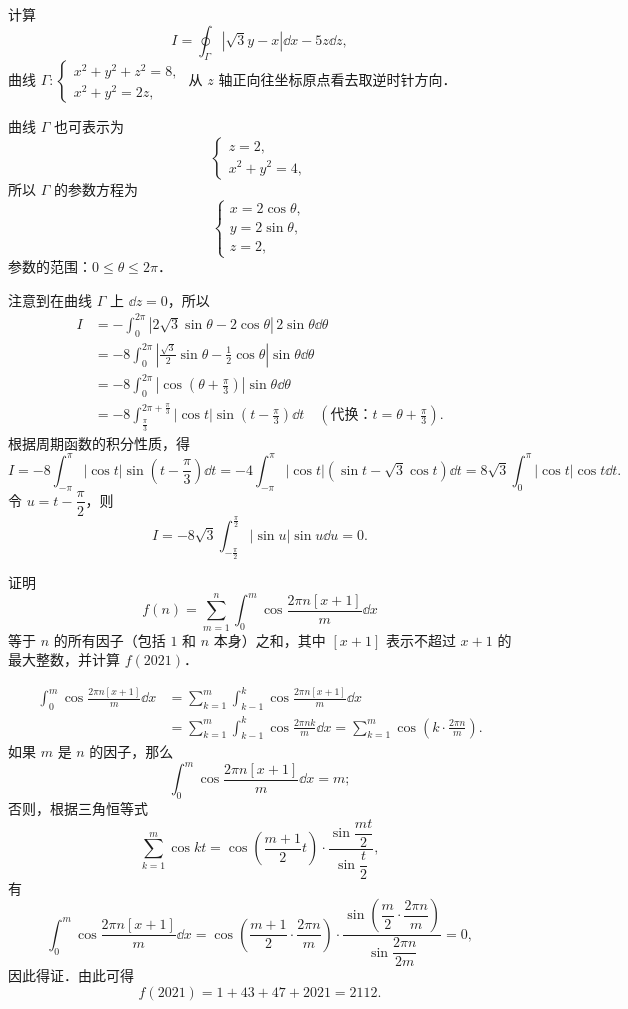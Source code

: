 计算
\[
  I=\oint_{\Gamma}\left|\sqrt{3}y-x\right|\dd x-5z\dd z,
\]
曲线 $\Gamma:\begin{cases}x^2+y^2+z^2=8,\\ x^2+y^2=2z,\end{cases}$ 从 $z$ 轴正向往坐标原点看去取逆时针方向．
\begin{solution}
曲线 $\Gamma$ 也可表示为
\[
  \begin{cases}
    z=2,\\
    x^2+y^2=4,
  \end{cases}
\]
所以 $\Gamma$ 的参数方程为
\[
  \begin{cases}
    x=2\cos\theta,\\
    y=2\sin\theta,\\
    z=2,
  \end{cases}
\]
参数的范围：$0\le\theta\le 2\pi$．

注意到在曲线 $\Gamma$ 上 $\dd z=0$，所以
\begin{align*}
I&=-\int_0^{2\pi}|2\sqrt{3}\sin\theta-2\cos\theta|\,2\sin\theta\dd\theta\\
&=-8\int_0^{2\pi}\left|\frac{\sqrt{3}}{2}\sin\theta-\frac{1}{2}\cos\theta\right|\sin\theta\dd\theta\\
&=-8\int_0^{2\pi}\left|\cos\left(\theta+\frac{\pi}{3}\right)\right|\sin\theta\dd\theta\\
&=-8\int_{\frac{\pi}{3}}^{2\pi+\frac{\pi}{3}}|\cos t|\sin\left(t-\frac{\pi}{3}\right)\dd t
\quad\left(\text{代换：}t=\theta+\frac{\pi}{3}\right).
\end{align*}
根据周期函数的积分性质，得
\[
  I=-8\int_{-\pi}^{\pi}|\cos t|\sin\left(t-\frac{\pi}{3}\right)\dd t
  =-4\int_{-\pi}^{\pi}|\cos t|(\sin t-\sqrt{3}\cos t)\dd t
  =8\sqrt{3}\int_0^{\pi}|\cos t|\cos t\dd t.
\]
令 $u=t-\dfrac{\pi}{2}$，则
\[
  I=-8\sqrt{3}\int_{-\frac{\pi}{2}}^{\frac{\pi}{2}}|\sin u|\sin u\dd u=0.
\]
\end{solution}

证明
\[
  f(n)=\sum_{m=1}^{n}\int_0^m\cos\frac{2\pi n[x+1]}{m}\dd x
\]
等于 $n$ 的所有因子（包括 $1$ 和 $n$ 本身）之和，其中 $[x+1]$ 表示不超过 $x+1$ 的最大整数，并计算 $f(2021)$．
\begin{solution}
\begin{align*}
\int_0^m\cos\frac{2\pi n[x+1]}{m}\dd x
&=\sum_{k=1}^{m}\int_{k-1}^{k}\cos\frac{2\pi n[x+1]}{m}\dd x\\
&=\sum_{k=1}^{m}\int_{k-1}^{k}\cos\frac{2\pi nk}{m}\dd x
=\sum_{k=1}^{m}\cos\left(k\cdot\frac{2\pi n}{m}\right).
\end{align*}
如果 $m$ 是 $n$ 的因子，那么
\[
  \int_0^m\cos\frac{2\pi n[x+1]}{m}\dd x=m;
\]
否则，根据三角恒等式
\[
  \sum_{k=1}^{m}\cos kt=\cos\left(\frac{m+1}{2}t\right)\cdot\frac{\sin\dfrac{mt}{2}}{\sin\dfrac{t}{2}},
\]
有
\[
  \int_0^m\cos\frac{2\pi n[x+1]}{m}\dd x
  =\cos\left(\frac{m+1}{2}\cdot\frac{2\pi n}{m}\right)\cdot
  \frac{\sin\left(\dfrac{m}{2}\cdot\dfrac{2\pi n}{m}\right)}{\sin\dfrac{2\pi n}{2m}}
  =0,
\]
因此得证．由此可得
\[
  f(2021)=1+43+47+2021=2112.
\]
\end{solution}

